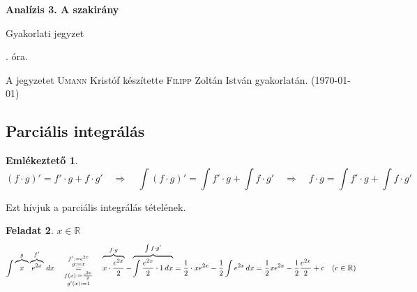 \documentclass[a4paper,11.5pt]{article}
\begin{document}
	\setlength\parindent{0pt}
	\def\a{\textbf{a}}
	\def\b{\textbf{b}}
	\def\N{\hskip 10 true mm}
	\def\a{\textbf{a}}
	\def\b{\textbf{b}}
	\def\c{\textbf{c}}
	\def\d{\textbf{d}}
	\def\e{\textbf{e}}
	\def\gg{$\gamma$}
	\def\vi{\textbf{i}}
	\def\jj{\textbf{j}}
	\def\kk{\textbf{k}}
	\def\fh{\overrightarrow}
	\def\l{\lambda}
	\def\m{\mu}
	\def\v{\textbf{v}}
	\def\0{\textbf{0}}
	\def\s{\hspace{0.2mm}\vphantom{\beta}}
	\def\Z{\mathbb{Z}}
	\def\Q{\mathbb{Q}}
	\def\R{\mathbb{R}}
	\def\C{\mathbb{C}}
	\def\N{\mathbb{N}}
	\def\Rn{\mathbb{R}^{n}}
	\def\Ra{\overline{\mathbb{R}}}
	\def\sume{\displaystyle\sum_{n=1}^{+\infty}}
	\def\sumn{\displaystyle\sum_{n=0}^{+\infty}}
	\def\biz{\emph{Bizonyítás:\ }}
	\def\narrow{\underset{n\rightarrow+\infty}{\longrightarrow}}
	\def\limn{\displaystyle\lim_{n\to +\infty}}
	
	\theoremstyle{definition}
	\newtheorem{theorem}{Tétel}[subsubsection] %
	
	\theoremstyle{definition}
	\newtheorem{definition}[theorem]{Definíció} %
	\newtheorem{example}[theorem]{Példa} %
	\newtheorem{exercise}[theorem]{Házi feladat} %
	\newtheorem{note}[theorem]{Megjegyzés} %
	\newtheorem{task}[theorem]{Feladat} %
	\newtheorem{revision}[theorem]{Emlékeztető} %
	\begin{center}
		{\LARGE\textbf{Analízis 3. A szakirány}}
		\smallskip
		
		{\Large Gyakorlati jegyzet}
		
		. óra.
	\end{center}
	A jegyzetet \textsc{Umann} Kristóf készítette \textsc{Filipp} Zoltán István gyakorlatán. (\today)
	\subsection{Parciális integrálás}
	\begin{revision}
		\[ (f\cdot g)'=f'\cdot g + f\cdot g'\quad \Rightarrow\quad \int(f\cdot g)'=\int f'\cdot g + \int f\cdot g'\quad \Rightarrow\quad f\cdot g=\int f'\cdot g + \int f\cdot g'\]
		\begin{center}	
		\end{center}
		Ezt hívjuk a parciális integrálás tételének.
	\end{revision}
	\begin{task}$x\in\R$
		\[ \int \overbrace{x\vphantom{e^2}}^{g}\overbrace{e^{2x}}^{f'}\,dx\quad \underset{g'(x):=1}{\overset{f':=e^{2x}}{\overset{g:=x}{\underset{f(x):=\frac{e^{2x}}{2}}{=}}}}
		\quad \overbrace{x\cdot\frac{e^{2x}}{2}}^{f\cdot g}-\overbrace{\int\frac{e^{2x}}{2}\cdot1\,dx}^{\int f\cdot g'}=\frac{1}{2}\cdot xe^{2x}-\frac{1}{2}\int e^{2x}\,dx=\frac{1}{2}xe^{2x}-\frac{1}{2}\frac{e^{2x}}{2}+c\quad (c\in\R) \]
	\end{task}
	
\end{document}
